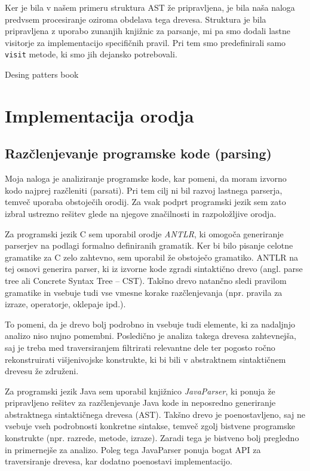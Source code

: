 \documentclass[a4paper,12pt,openright]{book}
\begin{document}
Ker je bila v našem primeru struktura AST že pripravljena, je bila naša naloga predvsem procesiranje oziroma obdelava tega drevesa. Struktura je bila pripravljena z uporabo zunanjih knjižnic za parsanje, mi pa smo dodali lastne visitorje za implementacijo specifičnih pravil. Pri tem smo predefinirali samo \texttt{visit} metode, ki smo jih dejansko potrebovali.

Desing patters book

\chapter{Implementacija orodja}
\label{ch2}

\section{Razčlenjevanje programske kode (parsing)}

Moja naloga je analiziranje programske kode, kar pomeni, da moram izvorno kodo najprej razčleniti (parsati). Pri tem cilj ni bil razvoj lastnega parserja, temveč uporaba obstoječih orodij. Za vsak podprt programski jezik sem zato izbral ustrezno rešitev glede na njegove značilnosti in razpoložljive orodja.

Za programski jezik C sem uporabil orodje \textit{ANTLR}, ki omogoča generiranje parserjev na podlagi formalno definiranih gramatik. Ker bi bilo pisanje celotne gramatike za C zelo zahtevno, sem uporabil že obstoječo gramatiko. ANTLR na tej osnovi generira parser, ki iz izvorne kode zgradi sintaktično drevo (angl. parse tree ali Concrete Syntax Tree – CST). Takšno drevo natančno sledi pravilom gramatike in vsebuje tudi vse vmesne korake razčlenjevanja (npr. pravila za izraze, operatorje, oklepaje ipd.).

To pomeni, da je drevo bolj podrobno in vsebuje tudi elemente, ki za nadaljnjo analizo niso nujno pomembni. Posledično je analiza takega drevesa zahtevnejša, saj je treba med traversiranjem filtrirati relevantne dele ter pogosto ročno rekonstruirati višjenivojske konstrukte, ki bi bili v abstraktnem sintaktičnem drevesu že združeni.

Za programski jezik Java sem uporabil knjižnico \textit{JavaParser}, ki ponuja že pripravljeno rešitev za razčlenjevanje Java kode in neposredno generiranje abstraktnega sintaktičnega drevesa (AST). Takšno drevo je poenostavljeno, saj ne vsebuje vseh podrobnosti konkretne sintakse, temveč zgolj bistvene programske konstrukte (npr. razrede, metode, izraze). Zaradi tega je bistveno bolj pregledno in primernejše za analizo. Poleg tega JavaParser ponuja bogat API za traversiranje drevesa, kar dodatno poenostavi implementacijo.
\end{document}
